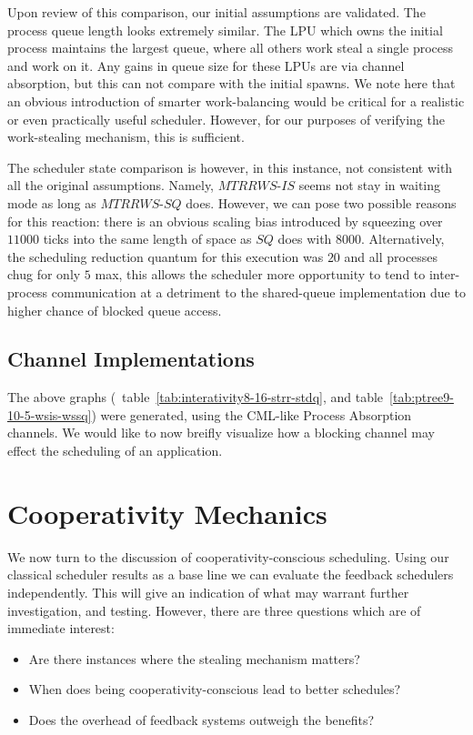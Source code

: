 Upon review of this comparison, our initial assumptions are validated. The process queue
length looks extremely similar. The LPU which owns the initial process maintains the 
largest queue, where all others work steal a single process and work on it. Any gains in
queue size for these LPUs are via channel absorption, but this can not compare with the
initial spawns. We note here that an obvious introduction of smarter work-balancing
would be critical for a realistic or even practically useful scheduler. However, for our
purposes of verifying the work-stealing mechanism, this is sufficient.

The scheduler state comparison is however, in this instance, not consistent with all
the original assumptions. Namely, $MTRRWS$-$IS$ seems not stay in waiting mode as long
as $MTRRWS$-$SQ$ does. However, we can pose two possible reasons for this reaction:
there is an obvious scaling bias introduced by squeezing over $11000$ ticks into the same length
of space as $SQ$ does with $8000$. Alternatively, the scheduling reduction quantum for 
this execution was $20$ and all processes chug for only $5$ max, this allows the 
scheduler more opportunity to tend to inter-process communication at a detriment to
the shared-queue implementation due to higher chance of blocked queue access.

\subsection{Channel Implementations}\label{sec:results-channel-implementations}

The above graphs (\eg~table~\ref{tab:interativity8-16-strr-stdq}, and 
table~\ref{tab:ptree9-10-5-wsis-wssq}) were generated, using the CML-like Process 
Absorption channels. We would like to now breifly visualize how a blocking channel
may effect the scheduling of an application.



\section{Cooperativity Mechanics}\label{sec:results-evaluation-feedback}

We now turn to the discussion of cooperativity-conscious scheduling.
Using our classical scheduler results as a base line we can evaluate 
the feedback schedulers independently. This will give an indication of what
may warrant further investigation, and testing. However, there are three 
questions which are of immediate interest:
\vspace{-3mm}\begin{itemize}
    \item Are there instances where the stealing mechanism matters?
    \item When does being cooperativity-conscious lead to better schedules?
    \item Does the overhead of feedback systems outweigh the benefits?
\end{itemize}






